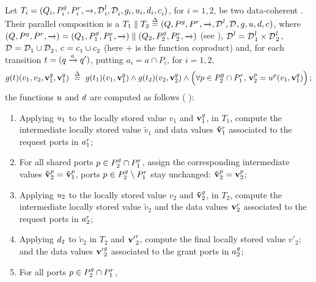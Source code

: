 \begin{definition}
  \label{defn:data:composition}
  Let $T_i = (Q_i, {P}^{g}_i, {P}^{r}_i, \xrightarrow[]{}, {\mathcal{D}^{}}^{l}_i, \mathcal{D}^{}_i,
  g_i, u_i, d_i, c^{{}}_i)$, for $i=1,2$, be two data-coherent
  \datamodel{}.  Their parallel composition is a \datamodel{} $T_1
  \parallel T_2 \stackrel{\Delta}{=} (Q, {P}^{g}, {P}^{r}, \xrightarrow[]{}, {\mathcal{D}^{}}^{l}, \mathcal{D}^{},
  g, u, d, c^{{}})$, where $(Q, {P}^{g}, {P}^{r}, \xrightarrow[]{}) =
  (Q_1, {P}^{g}_1, {P}^{r}_1, \xrightarrow[]{}) \parallel (Q_2, {P}^{g}_2, {P}^{r}_2,
  \xrightarrow[]{})$ (see ), ${\mathcal{D}^{}}^{l} = {\mathcal{D}^{}}^{l}_1
  \times {\ensuremath{\mathcal{D}^{}}}^{l}_2$, $\mathcal{D}^{} = \mathcal{D}^{}_1 \cup \mathcal{D}^{}_2$, $c^{{}} =
  c^{{}}_1 \cup c^{{}}_2$ (here $+$ is the function coproduct) and, for
  each transition $t = (q \xrightarrow[]{a} q')$, putting $a_i = a \cap P_i$, for
  $i=1,2$,
  \[
    \guard(t)(v_1, v_2, \grant{\portdata{v}}_1,\grant{\portdata{v}}_1)\ 
    \bydef{=}\
    \guard(t_1)(v_1, \grant{\portdata{v}}_1) \land
    \guard(t_2)(v_2, \grant{\portdata{v}}_2) \land
    \Big(\forall p \in \pin_2 \cap \pout_1,\,
    \portdata{v}^p_2 = \up^p(v_1, \grant{\portdata{v}}_1)\Big)\,;
  \]
  the functions $u$ and $d$ are computed as follows (\cf
  ):
  \begin{enumerate}
  \item \label{up1} Applying $u_1$ to the locally stored value $v_1$ and
    ${\mathbf{v}}^{g}_1$, in $T_1$, compute the intermediate locally
    stored value $\tilde{v}_1$ and data values
    ${\mathbf{\tilde{v}}}^{r}_1$ associated to the request ports in
    ${a}^{r}_1$;
  \item \label{transfer1} For all shared ports $p \in {P}^{g}_2 \cap {P}^{r}_1$,
    assign the corresponding intermediate values $\mathbf{\tilde{v}}^p_2
    = \mathbf{\tilde{v}}^p_1$, ports $p \in {P}^{g}_2 \setminus {P}^{r}_1$
    stay unchanged: $\mathbf{\tilde{v}}^p_2 = \mathbf{v}^p_2$;
  \item \label{up2} Applying $u_2$ to the locally stored value $v_2$ and
    ${\mathbf{\tilde{v}}}^{g}_2$, in $T_2$, compute the intermediate
    locally stored value $\tilde{v}_2$ and the data values
    ${\mathbf{v}}^{r}_2$ associated to the request ports in
    ${a}^{r}_2$;
  \item \label{down2} Applying $d_2$ to $\tilde{v}_2$ in $T_2$ and
    ${\mathbf{v'}}^{r}_2$, compute the final locally stored value
    $v'_2$;  and the data values ${\mathbf{v'}}^{g}_2$ associated to the
    grant ports in ${a}^{g}_2$;
  \item \label{transfer2} For all ports $p \in {P}^{g}_2 \cap {P}^{r}_1$,

\end{enumerate}
\end{definition}
